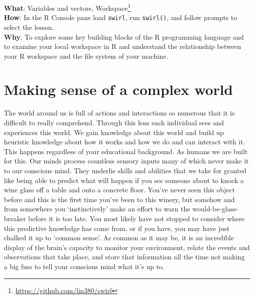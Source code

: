 \documentclass[
  letterpaper,
]{scrbook}
\DeclareRobustCommand{\href}[2]{#2\footnote{\url{#1}}}
\begin{document}
\begin{tcolorbox}[enhanced jigsaw, title=\textcolor{quarto-callout-tip-color}{\faLightbulb}\hspace{0.5em}{Swirl}, titlerule=0mm, toptitle=1mm, colbacktitle=quarto-callout-tip-color!10!white, bottomtitle=1mm, left=2mm, colframe=quarto-callout-tip-color-frame, breakable, toprule=.15mm, colback=white, opacitybacktitle=0.6, leftrule=.75mm, rightrule=.15mm, bottomrule=.15mm, arc=.35mm, coltitle=black, opacityback=0]

\textbf{What}: \href{https://github.com/lin380/swirl}{Variables and
vectors, Workspace}\\
\textbf{How}: In the R Console pane load \texttt{swirl}, run
\texttt{swirl()}, and follow prompts to select the lesson.\\
\textbf{Why}: To explore some key building blocks of the R programming
language and to examine your local workspace in R and understand the
relationship between your R workspace and the file system of your
machine.

\end{tcolorbox}

\hypertarget{text-making-sense-of-a-complex-world}{%
\section{Making sense of a complex
world}\label{text-making-sense-of-a-complex-world}}

The world around us is full of actions and interactions so numerous that
it is difficult to really comprehend. Through this lens each individual
sees and experiences this world. We gain knowledge about this world and
build up heuristic knowledge about how it works and how we do and can
interact with it. This happens regardless of your educational
background. As humans we are built for this. Our minds process countless
sensory inputs many of which never make it to our conscious mind. They
underlie skills and abilities that we take for granted like being able
to predict what will happen if you see someone about to knock a wine
glass off a table and onto a concrete floor. You've never seen this
object before and this is the first time you've been to this winery, but
somehow and from somewhere you `instinctively' make an effort to warn
the would-be-glass-breaker before it is too late. You most likely have
not stopped to consider where this predictive knowledge has come from,
or if you have, you may have just chalked it up to `common sense'. As
common as it may be, it is an incredible display of the brain's capacity
to monitor your environment, relate the events and observations that
take place, and store that information all the time not making a big
fuss to tell your conscious mind what it's up to.
\end{document}
